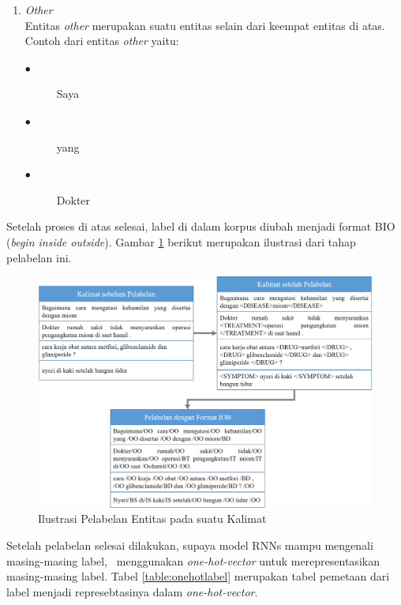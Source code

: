 \begin{enumerate}
	\item \textit{Other}\\
	Entitas \textit{other} merupakan suatu entitas selain dari keempat entitas di atas. Contoh dari entitas \textit{other} yaitu:
	\begin{description}
		\item[$\bullet$] Saya
		\item[$\bullet$] yang
		\item[$\bullet$] Dokter
	\end{description}

\end{enumerate}
Setelah proses di atas selesai, label di dalam korpus diubah menjadi format BIO (\textit{begin inside outside}). Gambar \ref{fig:pelabelan} berikut merupakan ilustrasi dari tahap pelabelan ini.
\begin{figure}
	\centering
	\includegraphics[width=\linewidth]{images/pelabelan}
	\caption{Ilustrasi Pelabelan Entitas pada suatu Kalimat}
	\label{fig:pelabelan}
\end{figure}

Setelah pelabelan selesai dilakukan, supaya model RNNs mampu mengenali masing-masing label, \saya~menggunakan \textit{one-hot-vector} untuk merepresentasikan masing-masing label. Tabel \ref{table:onehotlabel} merupakan tabel pemetaan dari label menjadi represebtasinya dalam \textit{one-hot-vector}.


